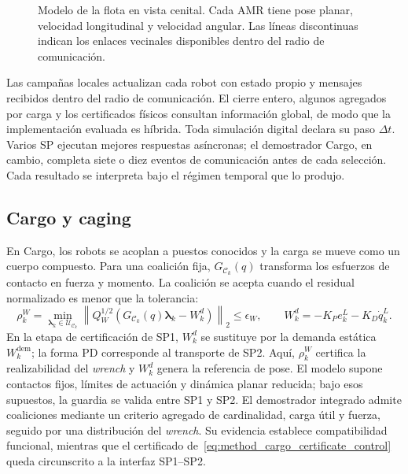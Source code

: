 \begin{figure}[H]
    \caption{Modelo de la flota en vista cenital. Cada AMR tiene pose planar,
    velocidad longitudinal y velocidad angular. Las líneas discontinuas indican
    los enlaces vecinales disponibles dentro del radio de comunicación.}
    \label{fig:method-unicycle-fleet}
    \viuownsource
\end{figure}
\fi

Las campañas locales actualizan cada robot con estado propio y mensajes recibidos
dentro del radio de comunicación. El cierre entero, algunos agregados por carga
y los certificados físicos consultan información global, de modo que la
implementación evaluada es híbrida. Toda simulación digital declara su paso
\(\Delta t\). Varios SP ejecutan mejores respuestas asíncronas; el demostrador
Cargo, en cambio, completa siete o diez eventos de comunicación antes de cada
selección. Cada resultado se interpreta bajo el régimen temporal que lo produjo.

\subsection{Cargo y caging}
\label{sec:method_physical_modes}

En Cargo, los robots se acoplan a puestos conocidos y la carga se mueve como un
cuerpo compuesto. Para una coalición fija, \(G_{\mathcal C_k}(q)\) transforma los
esfuerzos de contacto en fuerza y momento. La coalición se acepta cuando el
residual normalizado es menor que la tolerancia:
\begin{equation}
    \rho_k^W=
    \min_{\boldsymbol\lambda_k\in\mathcal U_{\mathcal C_k}}
    \left\|
        Q_W^{1/2}
        \left(G_{\mathcal C_k}(q)\boldsymbol\lambda_k-W_k^d\right)
    \right\|_2
    \leq\epsilon_W,
    \qquad
    W_k^d=-K_Pe_k^L-K_D\dot q_k^L.
    \label{eq:method_cargo_certificate_control}
\end{equation}
En la etapa de certificación de SP1, \(W_k^d\) se sustituye por la demanda estática
\(W_k^{\mathrm{dem}}\); la forma PD corresponde al transporte de SP2.
Aquí, \(\rho_k^W\) certifica la realizabilidad del \emph{wrench} y \(W_k^d\)
genera la referencia de pose. El modelo supone contactos fijos, límites de
actuación y dinámica planar reducida; bajo esos supuestos, la guardia se valida
entre SP1 y SP2. El demostrador integrado admite coaliciones mediante un criterio
agregado de cardinalidad, carga útil y fuerza, seguido por una distribución del
\emph{wrench}. Su evidencia establece compatibilidad funcional, mientras que el
certificado de~\eqref{eq:method_cargo_certificate_control} queda circunscrito a
la interfaz SP1--SP2.

